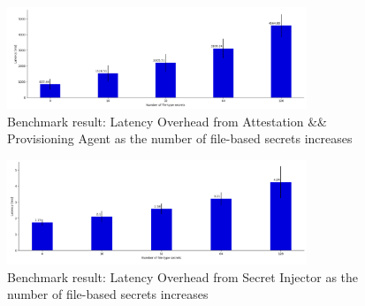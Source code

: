 \begin{figure}[H]
    \centering
    \includegraphics[width=0.8\textwidth]{images/overhead_attestation_agent_as_file_num_increasing.PNG}
    \caption[Benchmark result: Latency Overhead from Attestation \&\& Provisioning Agent as the number of file-based secrets increases]{Benchmark result: Latency Overhead from Attestation \&\& Provisioning Agent as the number of file-based secrets increases}
    \label{fig:overhead_attestation_agent_as_file_num_increasing}
\end{figure}

\begin{figure}[H]
    \centering
    \includegraphics[width=0.8\textwidth]{images/overhead_secret_injector_as_file_num_increasing.PNG}
    \caption[Benchmark result: Latency Overhead from Secret Injector as the number of file-based secrets increases]{Benchmark result: Latency Overhead from Secret Injector as the number of file-based secrets increases}
    \label{fig:overhead_secret_injector_as_file_num_increasing}
\end{figure}



